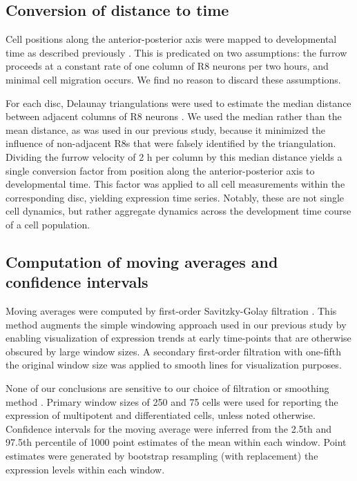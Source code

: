 \subsection{Conversion of distance to time}

Cell positions along the anterior-posterior axis were mapped to developmental time as described previously \cite{Pelaez2015,Pelaez2016}. This is predicated on two assumptions: the furrow proceeds at a constant rate of one column of R8 neurons per two hours, and minimal cell migration occurs. We find no reason to discard these assumptions.

For each disc, Delaunay triangulations were used to estimate the median distance between adjacent columns of R8 neurons \cite{Fortune1992}. We used the median rather than the mean distance, as was used in our previous study, because it minimized the influence of non-adjacent R8s that were falsely identified by the triangulation. Dividing the furrow velocity of 2 h per column by this median distance yields a single conversion factor from position along the anterior-posterior axis to developmental time. This factor was applied to all cell measurements within the corresponding disc, yielding expression time series. Notably, these are not single cell dynamics, but rather aggregate dynamics across the development time course of a cell population.

\subsection{Computation of moving averages and confidence intervals}

Moving averages were computed by first-order Savitzky-Golay filtration \cite{Savitzky1964}. This method augments the simple windowing approach used in our previous study \cite{Pelaez2015} by enabling visualization of expression trends at early time-points that are otherwise obscured by large window sizes. A secondary first-order filtration with one-fifth the original window size was applied to smooth lines for visualization purposes.

None of our conclusions are sensitive to our choice of filtration or smoothing method \cite{Pelaez2015}. Primary window sizes of 250 and 75 cells were used for reporting the expression of multipotent and differentiated cells, unless noted otherwise. Confidence intervals for the moving average were inferred from the 2.5th and 97.5th percentile of 1000 point estimates of the mean within each window. Point estimates were generated by bootstrap resampling (with replacement) the expression levels within each window.

